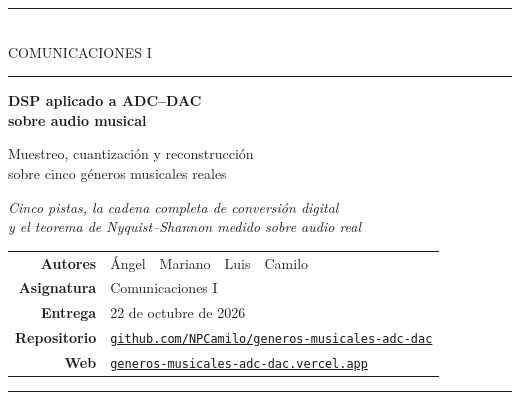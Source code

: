 \documentclass[11pt,a4paper]{article}
\begin{document}
\begin{titlepage}
\centering
\vspace*{1.2cm}

{\color{azul}\rule{\linewidth}{1.2pt}}\\[0.35cm]
{\small\color{suave}\MakeUppercase{Comunicaciones I}}\\[0.2cm]
{\color{azul}\rule{\linewidth}{0.4pt}}

\vspace{2.4cm}

{\Huge\bfseries\color{tinta} DSP aplicado a ADC--DAC\\[0.35cm]
sobre audio musical\par}

\vspace{0.9cm}

{\Large\color{suave} Muestreo, cuantización y reconstrucción\\
sobre cinco géneros musicales reales\par}

\vspace{1.6cm}

{\large\itshape
Cinco pistas, la cadena completa de conversión digital\\
y el teorema de Nyquist--Shannon medido sobre audio real\par}

\vfill

\begin{tabular}{rl}
\toprule
\textbf{Autores} & Ángel \,\textperiodcentered{}\, Mariano \,\textperiodcentered{}\, Luis \,\textperiodcentered{}\, Camilo \\
\textbf{Asignatura} & Comunicaciones I \\
\textbf{Entrega} & 22 de octubre de 2026 \\
\textbf{Repositorio} & \href{https://github.com/NPCamilo/generos-musicales-adc-dac}%
{\texttt{github.com/NPCamilo/generos-musicales-adc-dac}} \\
\textbf{Web} & \href{https://generos-musicales-adc-dac.vercel.app}%
{\texttt{generos-musicales-adc-dac.vercel.app}} \\
\bottomrule
\end{tabular}

\vspace{1.2cm}
{\color{azul}\rule{\linewidth}{0.4pt}}

\end{titlepage}
\end{document}
